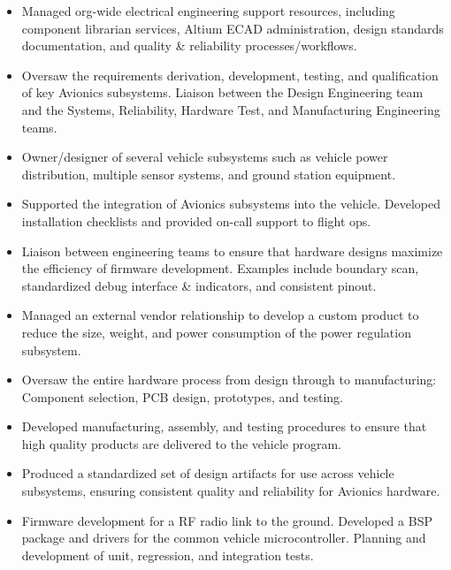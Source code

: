 \begin{entrylist}
{\begin{itemize}[leftmargin=12pt]
  \item Managed org-wide electrical engineering support resources, including component librarian services, Altium ECAD administration, design standards documentation, and quality \& reliability processes/workflows.
  \item Oversaw the requirements derivation, development, testing, and qualification of key Avionics subsystems. Liaison between the Design Engineering team and the Systems, Reliability, Hardware Test, and Manufacturing Engineering teams.
\end{itemize}
\begin{itemize}[leftmargin=12pt]
  \item Owner/designer of several vehicle subsystems such as vehicle power distribution, multiple sensor systems, and ground station equipment.
  \item Supported the integration of Avionics subsystems into the vehicle. Developed installation checklists and provided on-call support to flight ops.
  \item Liaison between engineering teams to ensure that hardware designs maximize the efficiency of firmware development. Examples include boundary scan, standardized debug interface \& indicators, and consistent pinout.
  \item Managed an external vendor relationship to develop a custom product to reduce the size, weight, and power consumption of the power regulation subsystem.
\end{itemize}
\begin{itemize}[leftmargin=12pt]
  \item Oversaw the entire hardware process from design through to manufacturing: Component selection, PCB design, prototypes, and testing.
  \item Developed manufacturing, assembly, and testing procedures to ensure that high quality products are delivered to the vehicle program.
  \item Produced a standardized set of design artifacts for use across vehicle subsystems, ensuring consistent quality and reliability for Avionics hardware.
  \item Firmware development for a RF radio link to the ground. Developed a BSP package and drivers for the common vehicle microcontroller. Planning and development of unit, regression, and integration tests.
\end{itemize}
}

\end{entrylist}